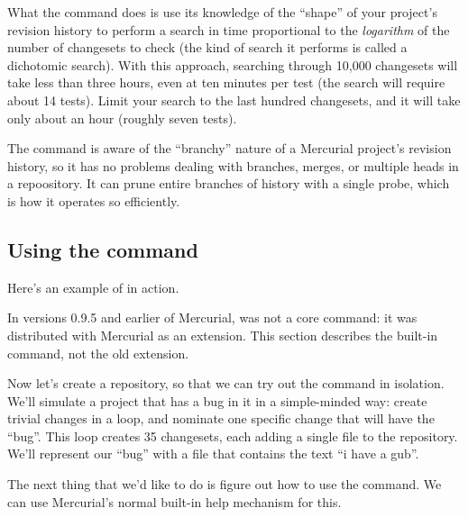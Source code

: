 What the  command does is use its knowledge of the
``shape'' of your project's revision history to perform a search in
time proportional to the \emph{logarithm} of the number of changesets
to check (the kind of search it performs is called a dichotomic
search).  With this approach, searching through 10,000 changesets will
take less than three hours, even at ten minutes per test (the search
will require about 14 tests).  Limit your search to the last hundred
changesets, and it will take only about an hour (roughly seven tests).

The  command is aware of the ``branchy'' nature of a
Mercurial project's revision history, so it has no problems dealing
with branches, merges, or multiple heads in a repoository.  It can
prune entire branches of history with a single probe, which is how it
operates so efficiently.

\subsection{Using the  command}

Here's an example of  in action.

\begin{note}
  In versions 0.9.5 and earlier of Mercurial,  was not a
  core command: it was distributed with Mercurial as an extension.
  This section describes the built-in command, not the old extension.
\end{note}

Now let's create a repository, so that we can try out the
 command in isolation.
We'll simulate a project that has a bug in it in a simple-minded way:
create trivial changes in a loop, and nominate one specific change
that will have the ``bug''.  This loop creates 35 changesets, each
adding a single file to the repository.  We'll represent our ``bug''
with a file that contains the text ``i have a gub''.

The next thing that we'd like to do is figure out how to use the
 command.  We can use Mercurial's normal built-in help
mechanism for this.

